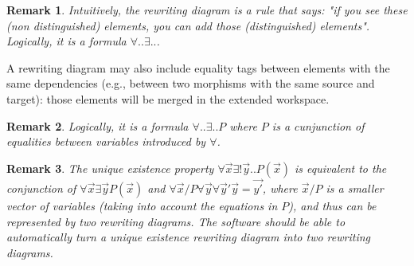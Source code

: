\documentclass{article}
\newtheorem{remark}{Remark}[section]
\begin{document}
\begin{remark}
    Intuitively, the rewriting diagram is a rule that says: "if you see these (non distinguished) elements, you can add those (distinguished) elements". Logically, it is a formula $∀ .. ∃ .. $.    
\end{remark}

A rewriting diagram may also include equality tags between elements with the same dependencies (e.g., between two morphisms with the same source and target): those elements will be merged in the extended workspace.

\begin{remark}
    \label{rem:formula-fo}
   Logically, it is a formula $∀ .. ∃ .. P $ where $P$ is a cunjunction of equalities between variables introduced by $∀ $.    
\end{remark}
\begin{remark}
    The unique existence property $∀ \vec{x}∃ !\vec{y}  .. P(\vec{x})$ is equivalent to the conjunction of 
    $ ∀ \vec{x}∃ \vec{y}  P(\vec{x})$ and $∀ \vec{x}/P ∀ \vec{y} ∀ \vec{y}' \vec{y}=\vec{y'} $, where $\vec{x}/P$ is a smaller vector of variables (taking into account the equations in $P$), and thus can be represented by two rewriting diagrams.
    The software should be able to automatically turn 
    a unique existence rewriting diagram into two rewriting diagrams.
\end{remark}
\end{document}

